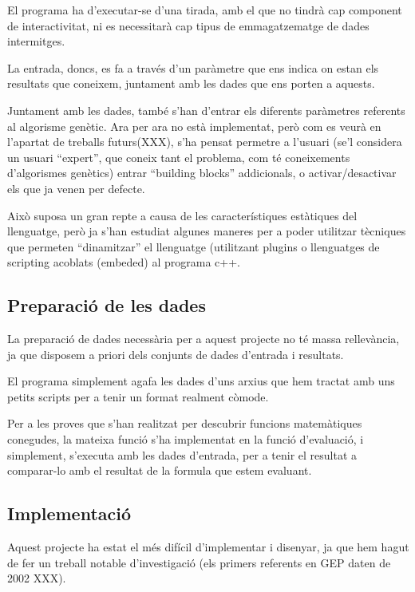 \documentclass[titlepage,a4paper,12pt]{book}
\begin{document}
El programa ha d'executar-se d'una tirada, amb el que no tindrà cap component de
interactivitat, ni es necessitarà cap tipus de emmagatzematge de dades
intermitges.

La entrada, doncs, es fa a través d'un paràmetre que ens indica on estan els
resultats que coneixem, juntament amb les dades que ens porten a aquests.

Juntament amb les dades, també s'han d'entrar els diferents paràmetres referents
al algorisme genètic.  Ara per ara no està implementat, però com es veurà en
l'apartat de treballs futurs(XXX), s'ha pensat permetre a l'usuari (se'l
considera un usuari ``expert'', que coneix tant el problema, com té coneixements
d'algorismes genètics) entrar ``building blocks'' addicionals, o
activar/desactivar els que ja venen per defecte.

Això suposa un gran repte a causa de les característiques estàtiques del
llenguatge, però ja s'han estudiat algunes maneres per a poder utilitzar
tècniques que permeten ``dinamitzar'' el llenguatge (utilitzant plugins o
llenguatges de scripting acoblats (embeded) al programa c++.


\subsection{Preparació de les dades} %
\label{sub:GPreparacio de dades}

La preparació de dades necessària per a aquest projecte no té massa rellevància,
ja que disposem a priori dels conjunts de dades d'entrada i resultats.

El programa simplement agafa les dades d'uns arxius que hem tractat amb uns
petits scripts per a tenir un format realment còmode.

Per a les proves que s'han realitzat per descubrir funcions matemàtiques
conegudes, la mateixa funció s'ha implementat en la funció d'evaluació, i
simplement, s'executa amb les dades d'entrada, per a tenir el resultat a
comparar-lo amb el resultat de la formula que estem evaluant.


\subsection{Implementació} %
\label{sub:GImplementacio}

Aquest projecte ha estat el més difícil d'implementar i disenyar, ja que hem
hagut de fer un treball notable d'investigació (els primers referents en GEP
daten de 2002 XXX).
\end{document}
